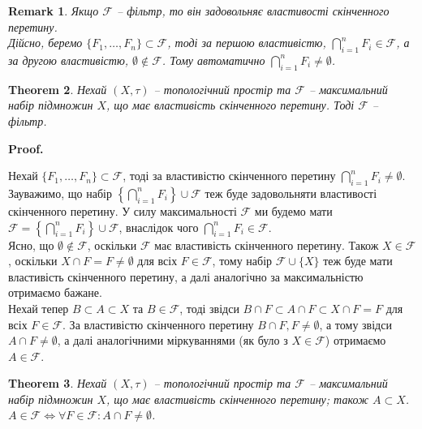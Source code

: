 \documentclass[a4paper, 10pt]{article}
\makeatletter
\theoremstyle{theoremdd}
\newtheorem{theorem}{Theorem}[subsection]
\newtheorem{remark}[theorem]{Remark}
\renewenvironment{proof}[1][Proof.\\]{\par
\pushQED{\hfill \qed}%
\normalfont \topsep6\p@\@plus6\p@\relax
\trivlist
\item\relax
{\bfseries
#1\@addpunct{.}}\hspace\labelsep\ignorespaces
}{%
\popQED\endtrivlist\@endpefalse
}
\makeatother
\begin{document}
\begin{remark}
Якщо $\mathcal{F}$ -- фільтр, то він задовольняє властивості скінченного перетину.\\
Дійсно, беремо $\{F_1,\dots,F_n\} \subset \mathcal{F}$, тоді за першою властивістю, $\displaystyle\bigcap_{i=1}^n F_i \in \mathcal{F}$, а за другою властивістю, $\emptyset \notin \mathcal{F}$. Тому автоматично $\displaystyle\bigcap_{i=1}^n F_i \neq \emptyset$.
\end{remark}

\begin{theorem}
\label{maximal_FIP_is_filter}
Нехай $(X,\tau)$ -- топологічний простір та $\mathcal{F}$ -- максимальний набір підмножин $X$, що має властивість скінченного перетину. Тоді $\mathcal{F}$ -- фільтр.
\end{theorem}

\begin{proof}
Нехай $\{F_1,\dots,F_n\} \subset \mathcal{F}$, тоді за властивістю скінченного перетину $\displaystyle\bigcap_{i=1}^n F_i \neq \emptyset$. Зауважимо, що набір $\displaystyle\left\{ \bigcap_{i=1}^n F_i \right\} \cup \mathcal{F}$ теж буде задовольняти властивості скінченного перетину. У силу максимальності $\mathcal{F}$ ми будемо мати $\mathcal{F} = \displaystyle\left\{ \bigcap_{i=1}^n F_i \right\} \cup \mathcal{F}$, внаслідок чого $\displaystyle \bigcap_{i=1}^n F_i \in \mathcal{F}$.\\
Ясно, що $\emptyset \notin \mathcal{F}$, оскільки $\mathcal{F}$ має властивість скінченного перетину. Також $X \in \mathcal{F}$, оскільки $X \cap F = F \neq \emptyset$ для всіх $F \in \mathcal{F}$, тому набір $\mathcal{F} \cup \{X\}$ теж буде мати властивість скінченного перетину, а далі аналогічно за максимальністю отримаємо бажане.\\
Нехай тепер $B \subset A \subset X$ та $B \in \mathcal{F}$, тоді звідси $B \cap F \subset A \cap F \subset X \cap F = F$ для всіх $F \in \mathcal{F}$. За властивістю скінченного перетину $B \cap F, F \neq \emptyset$, а тому звідси $A \cap F \neq \emptyset$, а далі аналогічними міркуваннями (як було з $X \in \mathcal{F}$) отримаємо $A \in \mathcal{F}$.
\end{proof}

\begin{theorem}
\label{in_maximal_FIP_when_does_set_belong_to_collection}
Нехай $(X,\tau)$ -- топологічний простір та $\mathcal{F}$ -- максимальний набір підмножин $X$, що має властивість скінченного перетину; також $A \subset X$.\\
$A \in \mathcal{F} \iff \forall F \in \mathcal{F}: A \cap F \neq \emptyset$.
\end{theorem}
\end{document}

